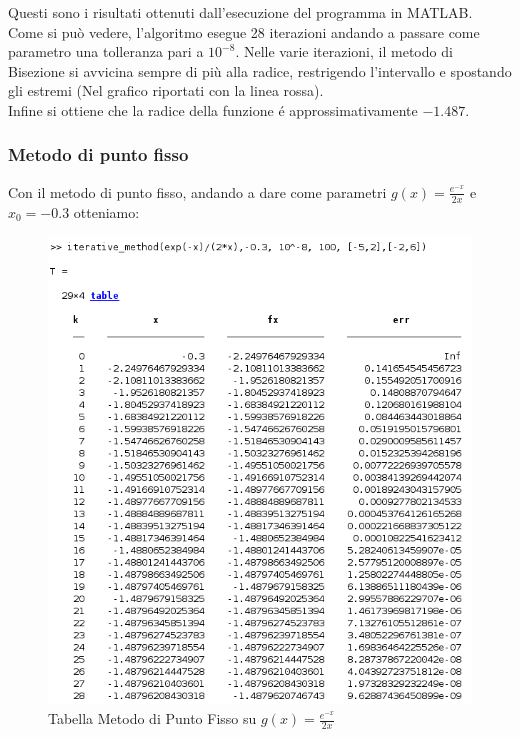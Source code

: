 \documentclass[12pt, letterpaper]{article}
\begin{document}
Questi sono i risultati ottenuti dall'esecuzione del programma in MATLAB.\\ Come si può vedere, l'algoritmo esegue 28 iterazioni andando a passare come parametro una tolleranza pari a $10^{-8}$.
Nelle varie iterazioni, il metodo di Bisezione si avvicina sempre di più alla radice, restrigendo l'intervallo e spostando gli estremi (Nel grafico riportati con la linea rossa). \\
Infine si ottiene che la radice della funzione \'e approssimativamente $-1.487$.

\newpage

\subsubsection{Metodo di punto fisso}
Con il metodo di punto fisso, andando a dare come parametri $g(x)=\frac{e^{-x}}{2x}$ e $x_0=-0.3$ otteniamo:
\begin{figure}[ht!]
    \includegraphics[scale=0.63]{TabellaEsponenzialePuntoFisso.png}
    \caption{Tabella Metodo di Punto Fisso su $g(x)=\frac{e^{-x}}{2x}$}
\end{figure}
\end{document}
